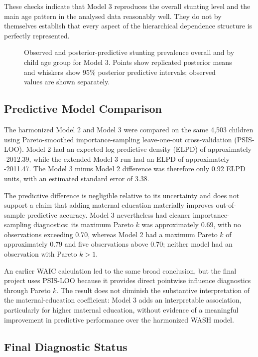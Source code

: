 These checks indicate that Model 3 reproduces the overall stunting level and the main age pattern in the analysed data reasonably well. They do not by themselves establish that every aspect of the hierarchical dependence structure is perfectly represented.

\begin{figure}[H]
\centering

\caption{Observed and posterior-predictive stunting prevalence overall and by child age group for Model 3. Points show replicated posterior means and whiskers show 95\% posterior predictive intervals; observed values are shown separately.}
\label{fig:model3_ppc_age}
\end{figure}

\subsection{Predictive Model Comparison}

The harmonized Model 2 and Model 3 were compared on the same 4,503 children using Pareto-smoothed importance-sampling leave-one-out cross-validation (PSIS-LOO). Model 2 had an expected log predictive density (ELPD) of approximately -2012.39, while the extended Model 3 run had an ELPD of approximately -2011.47. The Model 3 minus Model 2 difference was therefore only 0.92 ELPD units, with an estimated standard error of 3.38.

The predictive difference is negligible relative to its uncertainty and does not support a claim that adding maternal education materially improves out-of-sample predictive accuracy. Model 3 nevertheless had cleaner importance-sampling diagnostics: its maximum Pareto $k$ was approximately 0.69, with no observations exceeding 0.70, whereas Model 2 had a maximum Pareto $k$ of approximately 0.79 and five observations above 0.70; neither model had an observation with Pareto $k>1$.

An earlier WAIC calculation led to the same broad conclusion, but the final project uses PSIS-LOO because it provides direct pointwise influence diagnostics through Pareto $k$. The result does not diminish the substantive interpretation of the maternal-education coefficient: Model 3 adds an interpretable association, particularly for higher maternal education, without evidence of a meaningful improvement in predictive performance over the harmonized WASH model.

\subsection{Final Diagnostic Status}

